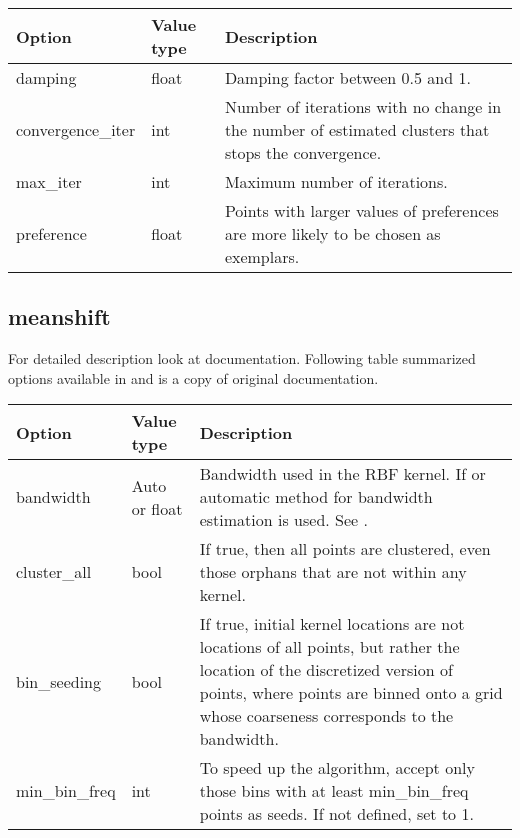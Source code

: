 \documentclass[a4paper,10pt,english]{sphinxmanual}
\begin{document}
\noindent\begin{tabulary}{\linewidth}{|L|L|L|}
\hline
\textsf{\relax 
Option
\unskip}\relax &\textsf{\relax 
Value type
\unskip}\relax &\textsf{\relax 
Description
\unskip}\relax \\
\hline
damping
&
float
&
Damping factor between 0.5 and 1.
\\
\hline
convergence\_iter
&
int
&
Number of iterations with no change in the number of estimated
clusters that stops the convergence.
\\
\hline
max\_iter
&
int
&
Maximum number of iterations.
\\
\hline
preference
&
float
&
Points with larger values of preferences are more likely to be
chosen as exemplars.
\\
\hline\end{tabulary}



\subsection{meanshift}
\label{valve/valve_config:meanshift}
For detailed description look at \href{http://scikit-learn.org/stable/modules/generated/sklearn.cluster.MeanShift.html\#sklearn.cluster.MeanShift}{} documentation. Following table summarized options available in  and is a copy of original documentation.

\noindent\begin{tabulary}{\linewidth}{|L|L|L|}
\hline
\textsf{\relax 
Option
\unskip}\relax &\textsf{\relax 
Value type
\unskip}\relax &\textsf{\relax 
Description
\unskip}\relax \\
\hline
bandwidth
&
Auto or float
&
Bandwidth used in the RBF kernel. If  or 
automatic method for bandwidth estimation is used. See
\href{http://scikit-learn.org/stable/modules/generated/sklearn.cluster.estimate\_bandwidth.html\#sklearn.cluster.estimate\_bandwidth}{}.
\\
\hline
cluster\_all
&
bool
&
If true, then all points are clustered, even those orphans that
are not within any kernel.
\\
\hline
bin\_seeding
&
bool
&
If true, initial kernel locations are not locations of all
points, but rather the location of the discretized version of
points, where points are binned onto a grid whose coarseness
corresponds to the bandwidth.
\\
\hline
min\_bin\_freq
&
int
&
To speed up the algorithm, accept only those bins with at least
min\_bin\_freq points as seeds. If not defined, set to 1.
\\
\hline\end{tabulary}
\end{document}
